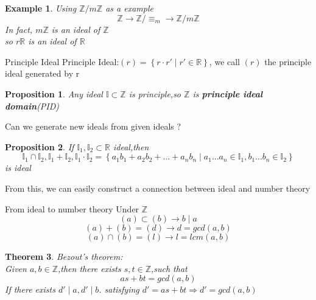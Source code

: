 \documentclass[13pt, a4paper, oneside]{book}
\newtheorem{theorem}{Theorem}[section]
\newtheorem{pro}[theorem]{Proposition}
\newtheorem{example}{Example}[section]
\begin{document}
	\begin{example}
		Using $\mathbb{Z} / m\mathbb{Z}$ as a example \\
		$$ \mathbb{Z} \longrightarrow \mathbb{Z}/ \equiv_{m} \longrightarrow \mathbb{Z}/ m\mathbb{Z} $$
		In fact, $m\mathbb{Z}$ is an ideal of $\mathbb{Z}$ \\
		so $ r\mathbb{R} $ is an ideal of $\mathbb{R}$
	\end{example}
	
	\begin{definition}{Principle Ideal}{}
		Principle Ideal:$(r) = \left\{ r \cdot r' \mid r' \in \mathbb{R} \right\}$, we call $(r)$ the principle ideal generated by r
	\end{definition}
	
	\begin{pro}
		Any ideal $\mathbb{I} \subset \mathbb{Z}$ is principle,so $\mathbb{Z}$ is \textbf{principle ideal domain}(PID)
	\end{pro}
	
	Can we generate new ideals from given ideals ?
	
	\begin{pro}
		If $\mathbb{I}_1, \mathbb{I}_2\subset \mathbb{R}$ ideal,then \\
		$$ \mathbb{I}_1 \cap \mathbb{I}_2 , \mathbb{I}_1 +\mathbb{I}_2, \mathbb{I}_1 \cdot \mathbb{I}_2 =\left\{ a_1b_1+a_2b_2 + ... +a_nb_n \mid a_1 ... a_n \in \mathbb{I}_1, b_1 ... b_n \in \mathbb{I}_2 \right\} $$ is ideal 
	\end{pro}
	
	From this, we can easily construct a connection between ideal and number theory
	
	\begin{definition}{From ideal to number theory}{}
		Under $\mathbb{Z}$
		$$ (a) \subset (b) \longrightarrow b\mid a $$
		$$ (a) + (b) = (d) \longrightarrow d = gcd(a,b) $$
		$$ (a) \cap (b) = (l) \longrightarrow l = lcm(a,b) $$
	\end{definition}
	
	\begin{theorem}
		Bezout's theorem: \\
		Given $a,b \in \mathbb{Z}$,then there exists $s,t \in \mathbb{Z}$,such that $$ as+bt =gcd(a,b) $$
		If there exists $d' \mid a, d' \mid b$. satisfying $d' = as+bt \Longrightarrow d' = gcd(a,b)$
	\end{theorem}
\end{document}
